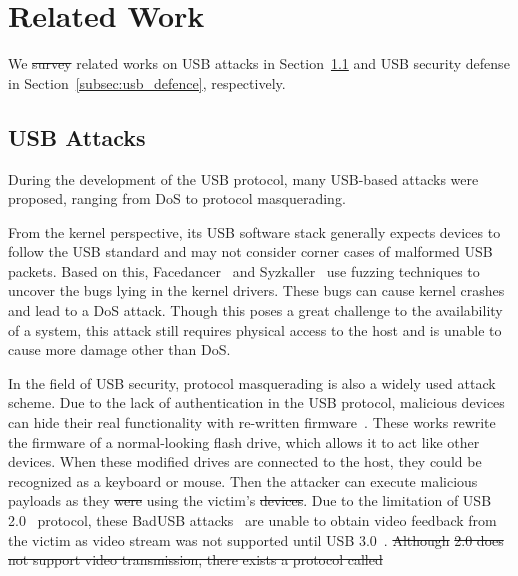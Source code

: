 \documentclass[conference]{IEEEtran}
\newcommand{\outline}[1]{}
\newcommand{\hongyi}[1]{}
\newcommand{\fengwei}[1]{}
\providecommand{\DIFaddtex}[1]{{\protect\color{blue}\uwave{#1}}} %
\providecommand{\DIFdeltex}[1]{{\protect\color{red}\sout{#1}}}                      %
\providecommand{\DIFaddbegin}{} %
\providecommand{\DIFaddend}{} %
\providecommand{\DIFdelbegin}{} %
\providecommand{\DIFdelend}{} %
\providecommand{\DIFadd}[1]{\texorpdfstring{\DIFaddtex{#1}}{#1}} %
\providecommand{\DIFdel}[1]{\texorpdfstring{\DIFdeltex{#1}}{}} %
\newcommand{\DIFscaledelfig}{0.5}
\newlength{\DIFdelgraphicswidth} %
\newlength{\DIFdelgraphicsheight} %
\newcommand{\DIFaddincludegraphics}[2][]{{\color{blue}\fbox{\DIFOincludegraphics[#1]{#2}}}} %
\newcommand{\DIFdelincludegraphics}[2][]{%
\sbox{\DIFdelgraphicsbox}{\DIFOincludegraphics[#1]{#2}}%
\settoboxwidth{\DIFdelgraphicswidth}{\DIFdelgraphicsbox} %
\settoboxtotalheight{\DIFdelgraphicsheight}{\DIFdelgraphicsbox} %
\scalebox{\DIFscaledelfig}{%
\parbox[b]{\DIFdelgraphicswidth}{\usebox{\DIFdelgraphicsbox}\\[-\baselineskip] \rule{\DIFdelgraphicswidth}{0em}}\llap{\resizebox{\DIFdelgraphicswidth}{\DIFdelgraphicsheight}{%
\setlength{\unitlength}{\DIFdelgraphicswidth}%
\begin{picture}(1,1)%
\thicklines\linethickness{2pt} %
{\color[rgb]{1,0,0}\put(0,0){\framebox(1,1){}}}%
{\color[rgb]{1,0,0}\put(0,0){\line( 1,1){1}}}%
{\color[rgb]{1,0,0}\put(0,1){\line(1,-1){1}}}%
\end{picture}%
}\hspace*{3pt}}} %
} %
\DeclareRobustCommand{\DIFaddbegin}{\DIFOaddbegin \let\includegraphics\DIFaddincludegraphics} %
\DeclareRobustCommand{\DIFaddend}{\DIFOaddend \let\includegraphics\DIFOincludegraphics} %
\DeclareRobustCommand{\DIFdelbegin}{\DIFOdelbegin \let\includegraphics\DIFdelincludegraphics} %
\DeclareRobustCommand{\DIFdelend}{\DIFOaddend \let\includegraphics\DIFOincludegraphics} %
\begin{document}
\section{Related Work}
\label{sec:related_work}

We \DIFdelbegin \DIFdel{survey }\DIFdelend \DIFaddbegin \DIFadd{surveyed }\DIFaddend related works on \ac{USB} attacks in Section~\ref{subsec:usb_attack} and
\ac{USB} security defense in Section~\ref{subsec:usb_defence}, respectively.

\subsection{USB Attacks}
\label{subsec:usb_attack}

During the development of the \ac{USB} protocol, many \mbox{\ac{USB}-based} attacks were proposed,
ranging from \ac{DoS} to protocol masquerading.

From the kernel perspective, its \ac{USB} software stack generally expects devices
to follow the \ac{USB} standard and may not consider corner cases of malformed \ac{USB}
packets. Based on this, Facedancer~\cite{facedancer} and
Syzkaller~\cite{syzkaller} use fuzzing techniques to uncover the bugs lying in
the kernel drivers. These bugs can cause kernel crashes and lead to a \ac{DoS} attack.
Though this poses a great challenge to the availability of a system, this
attack still requires physical access to the host and is unable to cause more
damage other than \ac{DoS}.

In the field of \ac{USB} security, protocol masquerading is also a widely used
attack scheme. Due to the lack of authentication in the \ac{USB} protocol, malicious
devices can hide their real functionality with re-written
firmware~\cite{rubber,badusb,rubberducky2020,usbbypassing,iseeyou,usbdriver}.
These works rewrite the firmware of a normal-looking flash drive, which allows
it to act like other devices. When these modified drives are connected to the
host, they could be recognized as a keyboard or mouse. Then the attacker can
execute malicious payloads as they \DIFdelbegin \DIFdel{were }\DIFdelend \DIFaddbegin \DIFadd{are }\DIFaddend using the victim's \DIFdelbegin \DIFdel{devices}\DIFdelend \DIFaddbegin \DIFadd{device}\DIFaddend . Due to the
limitation of \ac{USB} 2.0~\cite{usb20} protocol, these BadUSB
attacks~\cite{badusb} are unable to obtain video feedback from the victim
as video stream was not supported until \ac{USB} 3.0~\cite{usb30}. 
\DIFdelbegin \DIFdel{Although }%
\DIFdel{2.0 does not
support video transmission, there exists a protocol called }\DIFdelend \DIFaddbegin 
\end{document}
